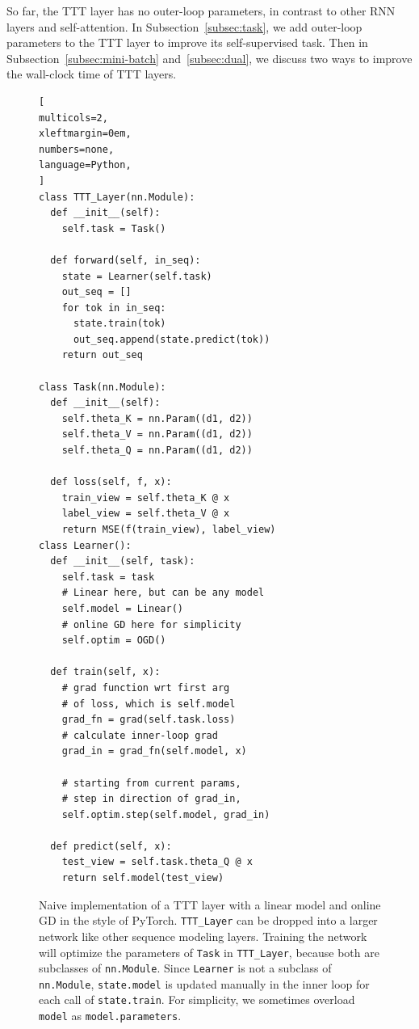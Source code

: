 \documentclass{article}
\begin{document}
So far, the TTT layer has no outer-loop parameters, in contrast to other RNN layers and self-attention.
In Subsection~\ref{subsec:task}, we add outer-loop parameters to the TTT layer to improve its self-supervised task. 
Then in Subsection~\ref{subsec:mini-batch} and~\ref{subsec:dual}, we discuss two ways to improve the wall-clock time of TTT layers.

\begin{figure}[t]
\vspace{-3ex}
\begin{lstlisting}[
multicols=2,
xleftmargin=0em, 
numbers=none,
language=Python, 
]
class TTT_Layer(nn.Module):
  def __init__(self):
    self.task = Task()

  def forward(self, in_seq):
    state = Learner(self.task)
    out_seq = []
    for tok in in_seq:
      state.train(tok)
      out_seq.append(state.predict(tok))
    return out_seq

class Task(nn.Module):
  def __init__(self):
    self.theta_K = nn.Param((d1, d2))
    self.theta_V = nn.Param((d1, d2))
    self.theta_Q = nn.Param((d1, d2))

  def loss(self, f, x):
    train_view = self.theta_K @ x
    label_view = self.theta_V @ x
    return MSE(f(train_view), label_view)
class Learner():
  def __init__(self, task):
    self.task = task
    # Linear here, but can be any model
    self.model = Linear()
    # online GD here for simplicity
    self.optim = OGD()

  def train(self, x):
    # grad function wrt first arg
    # of loss, which is self.model
    grad_fn = grad(self.task.loss)    
    # calculate inner-loop grad
    grad_in = grad_fn(self.model, x)

    # starting from current params,
    # step in direction of grad_in, 
    self.optim.step(self.model, grad_in)

  def predict(self, x):
    test_view = self.task.theta_Q @ x
    return self.model(test_view)
\end{lstlisting}
\vspace{1.5ex}
\caption{
Naive implementation of a TTT layer with a linear model and online GD in the style of PyTorch.
\texttt{TTT\_Layer} can be dropped into a larger network like other sequence modeling layers. 
Training the network will optimize the parameters of \texttt{Task} in \texttt{TTT\_Layer}, because both are subclasses of \texttt{nn.Module}.
Since \texttt{Learner} is not a subclass of \texttt{nn.Module}, \texttt{state.model} is updated manually in the inner loop for each call of \texttt{state.train}.
For simplicity, we sometimes overload \texttt{model} as \texttt{model.parameters}.
}
\label{fig:code}
\end{figure}
\end{document}
